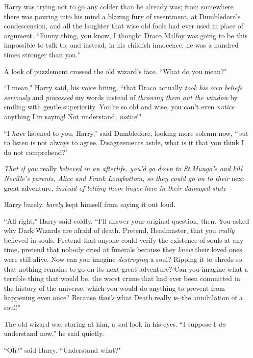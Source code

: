 Harry was trying not to go any colder than he already was; from somewhere there was pouring into his mind a blazing fury of resentment, at Dumbledore's condescension, and all the laughter that wise old fools had ever used in place of argument. ``Funny thing, you know, I thought Draco Malfoy was going to be this impossible to talk to, and instead, in his childish innocence, he was a hundred times stronger than you."

A look of puzzlement crossed the old wizard's face. ``What do you mean?"

``I mean," Harry said, his voice biting, ``that Draco actually \emph{took his own beliefs seriously} and \emph{processed} my words instead of \emph{throwing them out the window} by smiling with gentle superiority. You're so old and wise, you can't even \emph{notice} anything I'm saying! Not understand, \emph{notice}!"

``I \emph{have} listened to you, Harry," said Dumbledore, looking more solemn now, ``but to listen is not always to agree. Disagreements aside, what is it that you think I do not comprehend?"

\emph{That if you} really \emph{believed in an afterlife, you'd go down to St.\?Mungo's and kill Neville's parents, Alice and Frank Longbottom, so they could go on to their} next great adventure\emph{, instead of letting them linger here in their damaged state\---}

Harry barely, \emph{barely} kept himself from saying it out loud.

``All right," Harry said coldly. ``I'll answer your original question, then. You asked why Dark Wizards are afraid of death. Pretend, Headmaster, that you \emph{really} believed in souls. Pretend that anyone could verify the existence of souls at any time, pretend that nobody cried at funerals because they \emph{knew} their loved ones were still alive. Now can you imagine \emph{destroying} a soul? Ripping it to shreds so that nothing remains to go on its next great adventure? Can you imagine what a terrible thing that would be, the worst crime that had ever been committed in the history of the universe, which you would do anything to prevent from happening even once? Because \emph{that's} what Death really is\---the annihilation of a soul!"

The old wizard was staring at him, a sad look in his eyes. ``I suppose I \emph{do} understand now," he said quietly.

``Oh?" said Harry. ``Understand what?"

